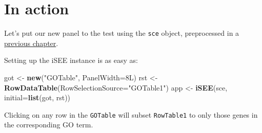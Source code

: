 \documentclass[]{book}
\newenvironment{Shaded}{\begin{snugshade}}{\end{snugshade}}
\newcommand{\KeywordTok}[1]{\textcolor[rgb]{0.13,0.29,0.53}{\textbf{#1}}}
\newcommand{\DataTypeTok}[1]{\textcolor[rgb]{0.13,0.29,0.53}{#1}}
\newcommand{\StringTok}[1]{\textcolor[rgb]{0.31,0.60,0.02}{#1}}
\newcommand{\ControlFlowTok}[1]{\textcolor[rgb]{0.13,0.29,0.53}{\textbf{#1}}}
\newcommand{\OperatorTok}[1]{\textcolor[rgb]{0.81,0.36,0.00}{\textbf{#1}}}
\newcommand{\NormalTok}[1]{#1}
\begin{document}
\begin{Shaded}
\end{Shaded}

\section{In action}\label{in-action-3}

Let's put our new panel to the test using the \texttt{sce} object,
preprocessed in a \protect\hyperlink{developing}{previous chapter}.

Setting up the iSEE instance is as easy as:

\begin{Shaded}
\begin{Highlighting}[]
\NormalTok{got <-}\StringTok{ }\KeywordTok{new}\NormalTok{(}\StringTok{"GOTable"}\NormalTok{, }\DataTypeTok{PanelWidth=}\NormalTok{8L)}
\NormalTok{rst <-}\StringTok{ }\KeywordTok{RowDataTable}\NormalTok{(}\DataTypeTok{RowSelectionSource=}\StringTok{"GOTable1"}\NormalTok{)}
\NormalTok{app <-}\StringTok{ }\KeywordTok{iSEE}\NormalTok{(sce, }\DataTypeTok{initial=}\KeywordTok{list}\NormalTok{(got, rst))}
\end{Highlighting}
\end{Shaded}

Clicking on any row in the \texttt{GOTable} will subset
\texttt{RowTable1} to only those genes in the corresponding GO term.


\end{document}
